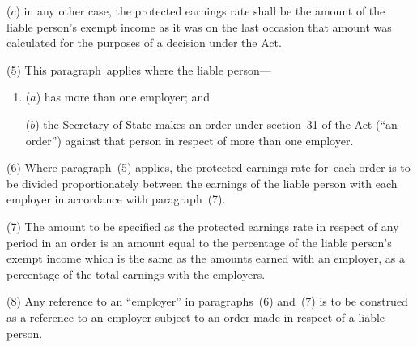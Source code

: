 \documentclass[12pt,a4paper]{article}
\begin{document}
{\begin{enumerate}
($c$) in any other case, the protected earnings rate shall be the amount of the liable person’s exempt income as it was on the last occasion that amount was calculated for the purposes of a decision under the Act.
\end{enumerate}

(5) This paragraph~applies where the liable person—
\begin{enumerate}\item[]
($a$) has more than one employer; and

($b$) the Secretary of State makes an order under section~31 of the Act (“an order”) against that person in respect of more than one employer.
\end{enumerate}

(6) Where paragraph~(5) applies, the protected earnings rate for~each order is to be divided proportionately between the earnings of the liable person with each employer in accordance with paragraph~(7).

(7) The amount to be specified as the protected earnings rate in respect of any period in an order is an amount equal to the percentage of the liable person’s exempt income which is the same as the amounts earned with an employer, as a percentage of the total earnings with the employers.

(8) Any reference to an “employer” in paragraphs~(6) and~(7) is to be construed as a reference to an employer subject to an order made in respect of a liable person.
}

\end{document}
